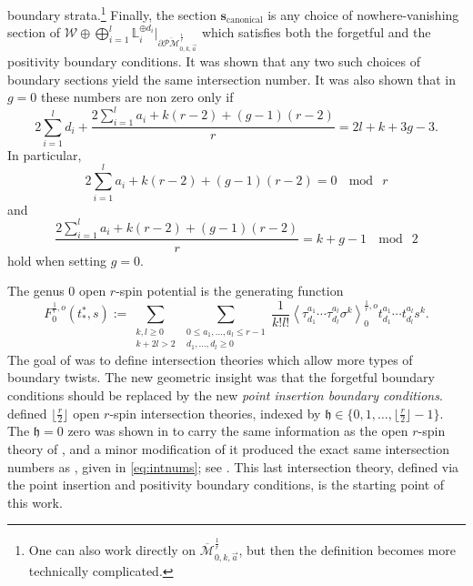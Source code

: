 \documentclass[11pt]{amsart}
\theoremstyle{definition}
\theoremstyle{remark}
\newcommand{\Mbarr}{{{\overline{\mathcal{M}}}^{\frac{1}{r}}_{0,k,\vec{a}}}}
\newcommand{\oPMr}{{{\overline{\mathcal{PM}}}^{\frac{1}{r}}_{0,k,\vec{a}}}}
\newcommand{\<}{\left<}
\renewcommand{\>}{\right>}
\numberwithin{equation}{section}
\begin{document}
boundary strata.\footnote{One can also work directly on $\Mbarr$, but then the definition becomes more technically complicated.} Finally, %
the section $\mathbf{s}_{\text{canonical}}$ is any choice of nowhere-vanishing section of $\mathcal{W} \oplus \bigoplus_{i=1}^l\mathbb{L}_i^{\oplus d_i}|_{\partial\oPMr}$ which satisfies both %
the forgetful and %
the positivity boundary conditions.  It was shown that any two such choices of boundary sections yield the same intersection number.
It was also shown that in $g=0$ these numbers are non zero only if
\begin{equation}\label{eq:dim_equal_rk}
2\sum_{i=1}^l d_i +\frac{2\sum_{i=1}^la_i+k(r-2)+(g-1)(r-2)}{r}=2l+k+3g-3.
\end{equation}
In %
particular, 
\begin{equation}\label{eq:mod_r_general_g}
{2\sum_{i=1}^la_i+k(r-2)+(g-1)(r-2)}=0~\mod~r
\end{equation}
and %
\begin{equation}\label{eq:mod_2_general_g}
\frac{2\sum_{i=1}^la_i+k(r-2)+(g-1)(r-2)}{r} = k+g-1~\mod~2
\end{equation}
hold when setting $g=0.$ 


The genus $0$ open $r$-spin potential is the generating function
\[
F^{\frac{1}{r},o}_0(t^*_*,s):=\sum_{\substack{k,l\geq 0\\k+2l>2}} \sum_{\substack{0 \leq a_1, \ldots, a_l \leq r-1\\ d_1, \ldots, d_l \geq 0}} \frac{1}{k!l!}\<\tau^{a_1}_{d_1}\cdots\tau^{a_l}_{d_l}\sigma^k\>^{\frac{1}{r},o}_0 t^{a_1}_{d_1} \cdots t^{a_l}_{d_l}s^k.
\]
The goal of \cite{TZ1,TZ2} was to define intersection theories which allow more types of boundary twists.
The new geometric insight was that the forgetful boundary conditions should be replaced by the new \emph{point insertion boundary conditions}.
\cite{TZ2} defined $\lfloor\frac{r}{2}\rfloor$ open $r$-spin intersection theories, indexed by $\mathfrak{h}\in\{0,1,\ldots,\lfloor\frac{r}{2}\rfloor-1\}.$ The $\mathfrak{h}=0$ zero was shown in \cite[\S 5]{TZ2} to carry the same information as the open $r$-spin theory of \cite{BCT2}, and a minor %
modification of it produced the exact same intersection numbers as \cite{BCT2}, given in \eqref{eq:intnums}; see %
\cite[Remark 5.7]{TZ2}.
This last intersection theory, defined via the point insertion and positivity boundary conditions, is the starting point of this work.   
\end{document}
